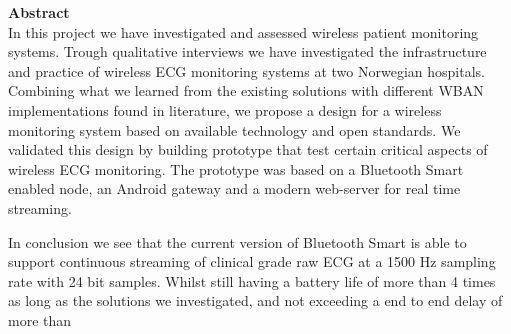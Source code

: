 \noindent \textbf{Abstract}
\\
\newline	
\noindent
In this project we have investigated and assessed wireless patient monitoring systems. Trough qualitative interviews we have investigated the infrastructure and practice of wireless ECG monitoring systems at two Norwegian hospitals. Combining what we learned from the existing solutions with different WBAN implementations found in literature, we propose a design for a wireless monitoring system based on available technology and open standards. We validated this design by building prototype that test certain critical aspects of wireless ECG monitoring. The prototype was based on a Bluetooth Smart enabled node, an Android gateway and a modern web-server for real time streaming.

In conclusion we see that the current version of Bluetooth Smart is able to support continuous streaming of clinical grade raw ECG at a 1500 Hz sampling rate with 24 bit samples. Whilst still having a battery life of more than 4 times as long as the solutions we investigated, and not exceeding a end to end delay of more than 